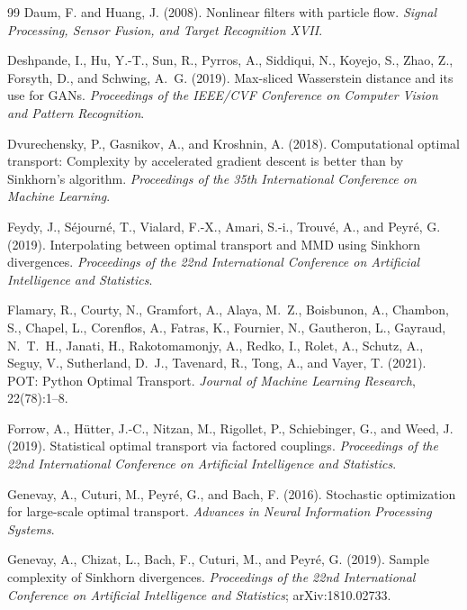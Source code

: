 \documentclass[11pt]{article}
\begin{document}
\begin{thebibliography}{99}
Daum, F. and Huang, J. (2008).
\newblock Nonlinear filters with particle flow.
\newblock \emph{Signal Processing, Sensor Fusion, and Target Recognition XVII}.

Deshpande, I., Hu, Y.-T., Sun, R., Pyrros, A., Siddiqui, N., Koyejo, S.,
Zhao, Z., Forsyth, D., and Schwing, A.~G. (2019).
\newblock Max-sliced Wasserstein distance and its use for GANs.
\newblock \emph{Proceedings of the IEEE/CVF Conference on Computer Vision and
Pattern Recognition}.

Dvurechensky, P., Gasnikov, A., and Kroshnin, A. (2018).
\newblock Computational optimal transport: Complexity by accelerated gradient
descent is better than by Sinkhorn's algorithm.
\newblock \emph{Proceedings of the 35th International Conference on Machine
Learning}.

Feydy, J., S{\'e}journ{\'e}, T., Vialard, F.-X., Amari, S.-i., Trouv{\'e}, A.,
and Peyr{\'e}, G. (2019).
\newblock Interpolating between optimal transport and MMD using Sinkhorn
divergences.
\newblock \emph{Proceedings of the 22nd International Conference on Artificial
Intelligence and Statistics}.

Flamary, R., Courty, N., Gramfort, A., Alaya, M.~Z., Boisbunon, A., Chambon,
S., Chapel, L., Corenflos, A., Fatras, K., Fournier, N., Gautheron, L.,
Gayraud, N.~T.~H., Janati, H., Rakotomamonjy, A., Redko, I., Rolet, A., Schutz,
A., Seguy, V., Sutherland, D.~J., Tavenard, R., Tong, A., and Vayer, T. (2021).
\newblock POT: Python Optimal Transport.
\newblock \emph{Journal of Machine Learning Research}, 22(78):1--8.

Forrow, A., H{\"u}tter, J.-C., Nitzan, M., Rigollet, P., Schiebinger, G., and
Weed, J. (2019).
\newblock Statistical optimal transport via factored couplings.
\newblock \emph{Proceedings of the 22nd International Conference on Artificial
Intelligence and Statistics}.

Genevay, A., Cuturi, M., Peyr{\'e}, G., and Bach, F. (2016).
\newblock Stochastic optimization for large-scale optimal transport.
\newblock \emph{Advances in Neural Information Processing Systems}.

Genevay, A., Chizat, L., Bach, F., Cuturi, M., and Peyr{\'e}, G. (2019).
\newblock Sample complexity of Sinkhorn divergences.
\newblock \emph{Proceedings of the 22nd International Conference on Artificial
Intelligence and Statistics}; arXiv:1810.02733.


\end{thebibliography}
\end{document}

